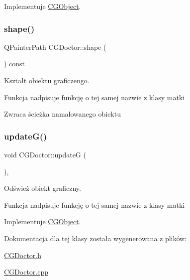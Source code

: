 Implementuje \mbox{\hyperlink{class_c_g_object_a9622c313eb09ca5fc0e34f5d2aaac910}{C\+G\+Object}}.

\mbox{\label{class_c_g_doctor_abfb22c548f5d97fddef40b928b7d16bb}} 
\subsubsection{\texorpdfstring{shape()}{shape()}}
{\footnotesize\ttfamily Q\+Painter\+Path C\+G\+Doctor\+::shape (\begin{DoxyParamCaption}{ }\end{DoxyParamCaption}) const\hspace{0.3cm}{\ttfamily [override]}}



Kształt obiektu graficzengo. 

Funkcja nadpisuje funkcję o tej samej nazwie z klasy matki \begin{DoxyReturn}{Zwraca}
ścieżka namalowanego obiektu 
\end{DoxyReturn}
\mbox{\label{class_c_g_doctor_a601c4bccc44e7a44540079e873c5ea8f}} 
\subsubsection{\texorpdfstring{update\+G()}{updateG()}}
{\footnotesize\ttfamily void C\+G\+Doctor\+::updateG (\begin{DoxyParamCaption}{ }\end{DoxyParamCaption})\hspace{0.3cm}{\ttfamily [override]}, {\ttfamily [virtual]}}



Odśwież obiekt graficzny. 

Funkcja nadpisuje funkcję o tej samej nazwie z klasy matki 

Implementuje \mbox{\hyperlink{class_c_g_object_a95e80549666e955edd57ab042c2e8ef5}{C\+G\+Object}}.



Dokumentacja dla tej klasy została wygenerowana z plików\+:\begin{DoxyCompactItemize}
\item 
\mbox{\hyperlink{_c_g_doctor_8h}{C\+G\+Doctor.\+h}}\item 
\mbox{\hyperlink{_c_g_doctor_8cpp}{C\+G\+Doctor.\+cpp}}\end{DoxyCompactItemize}

